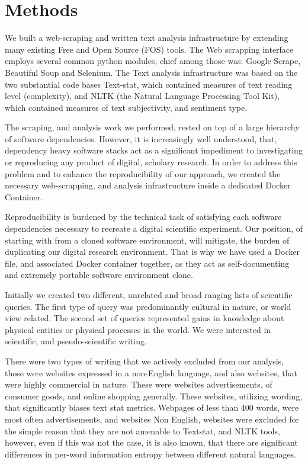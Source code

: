 \documentclass{clv3}
\begin{document}
\section{Methods}

We built a web-scraping and written text analysis infrastructure by extending many existing Free and Open Source (FOS) tools. The Web scrapping interface employs several common python modules, chief among those was: Google Scrape, Beautiful Soup and Selenium. The Text analysis infrastructure was based on the two substantial code bases Text-stat, which contained measures of text reading level (complexity), and NLTK (the Natural Language Processing Tool Kit), which contained measures of text subjectivity, and sentiment type.

The scraping, and analysis work we performed, rested on top of a large hierarchy of software dependencies. However, it is increasingly well understood, that, dependency heavy software stacks act as a significant impediment to investigating or reproducing any product of digital, scholary research. In order to address this problem and to enhance the reproducibility of our approach, we created the necessary web-scrapping, and analysis infrastructure inside a dedicated Docker Container.

Reproducibility is burdened by the technical task of satisfying each software dependencies necessary to recreate a digital scientific experiment. Our position, of starting with from a cloned software environment, will mitigate, the burden of duplicating our digital research environment. That is why we have used a Docker file, and associated Docker container together, as they act as self-documenting and extremely portable software environment clone.

Initially we created two different, unrelated and broad ranging lists of scientific queries. The first type of query was predominantly cultural in nature, or world view related. The second set of queries represented gains in knowledge about physical entities or physical processes in the world. We were interested in scientific, and pseudo-scientific writing.

There were two types of writing that we actively excluded from our analysis, those were websites expressed in a non-English language, and also websites, that were highly commercial in nature. These were websites advertisements, of consumer goods, and online shopping generally. These websites, utilizing wording, that significantly biases text stat metrics. Webpages of less than 400 words, were most often advertisements, and websites
Non English, websites were excluded for the simple reason that they are not amenable to Textstat, and NLTK tools, however, even if this was not the case, it is also known, that there are  significant differences in per-word information entropy between different natural languages.
\end{document}
